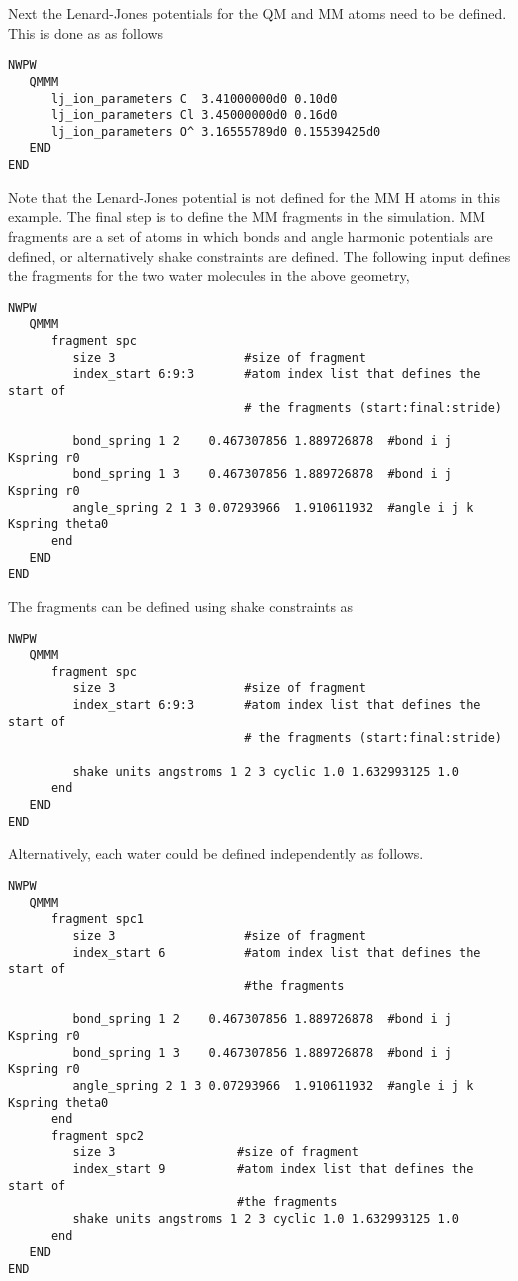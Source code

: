 Next the Lenard-Jones potentials for the QM and MM atoms need to be defined.  This is done as as follows
\begin{verbatim}
NWPW
   QMMM
      lj_ion_parameters C  3.41000000d0 0.10d0
      lj_ion_parameters Cl 3.45000000d0 0.16d0
      lj_ion_parameters O^ 3.16555789d0 0.15539425d0
   END
END
\end{verbatim}
Note that the Lenard-Jones potential is not defined for the MM H atoms in this example.  
The final step is to define the MM fragments in the simulation.  MM fragments are a set of 
atoms in which bonds and angle harmonic potentials are defined, or alternatively shake constraints are defined.  
The following input defines the fragments for the two water molecules in the above geometry,
\begin{verbatim}
NWPW
   QMMM
      fragment spc
         size 3                  #size of fragment
         index_start 6:9:3       #atom index list that defines the start of 
                                 # the fragments (start:final:stride)

         bond_spring 1 2    0.467307856 1.889726878  #bond i j    Kspring r0
         bond_spring 1 3    0.467307856 1.889726878  #bond i j    Kspring r0
         angle_spring 2 1 3 0.07293966  1.910611932  #angle i j k Kspring theta0
      end
   END
END
\end{verbatim}
The fragments can be defined using shake constraints as
\begin{verbatim}
NWPW
   QMMM
      fragment spc
         size 3                  #size of fragment
         index_start 6:9:3       #atom index list that defines the start of 
                                 # the fragments (start:final:stride)

         shake units angstroms 1 2 3 cyclic 1.0 1.632993125 1.0
      end
   END
END
\end{verbatim}
Alternatively, each water could be defined independently as follows.
\begin{verbatim}
NWPW
   QMMM
      fragment spc1
         size 3                  #size of fragment
         index_start 6           #atom index list that defines the start of 
                                 #the fragments 

         bond_spring 1 2    0.467307856 1.889726878  #bond i j    Kspring r0
         bond_spring 1 3    0.467307856 1.889726878  #bond i j    Kspring r0
         angle_spring 2 1 3 0.07293966  1.910611932  #angle i j k Kspring theta0
      end
      fragment spc2
         size 3                 #size of fragment
         index_start 9          #atom index list that defines the start of 
                                #the fragments
         shake units angstroms 1 2 3 cyclic 1.0 1.632993125 1.0
      end
   END
END
\end{verbatim}


